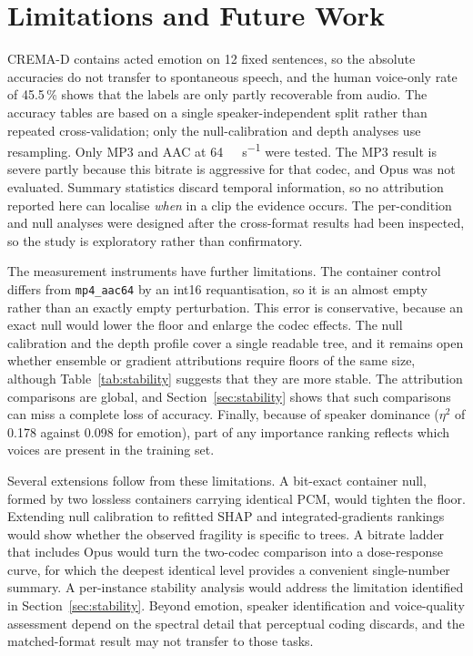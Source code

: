 \documentclass[lettersize,journal]{IEEEtran}
\newcommand{\ttf}[1]{\texttt{\footnotesize #1}}
\begin{document}
\section{Limitations and Future Work}
CREMA-D contains acted emotion on 12 fixed sentences, so the absolute
accuracies do not transfer to spontaneous speech, and the human voice-only rate
of 45.5\,\% shows that the labels are only partly recoverable from audio. The
accuracy tables are based on a single speaker-independent split rather than
repeated cross-validation; only the null-calibration and depth analyses use
resampling. Only MP3 and AAC at \SI{64}{\kilo\bit\per\second} were tested. The
MP3 result is severe partly because this bitrate is aggressive for that codec,
and Opus was not evaluated. Summary statistics discard temporal information, so
no attribution reported here can localise \emph{when} in a clip the evidence
occurs. The per-condition and null analyses were designed after the
cross-format results had been inspected, so the study is exploratory rather
than confirmatory.

The measurement instruments have further limitations. The container control
differs from \ttf{mp4\_aac64} by an int16 requantisation, so it is an almost
empty rather than an exactly empty perturbation. This error is conservative,
because an exact null would lower the floor and enlarge the codec effects. The
null calibration and the depth profile cover a single readable tree, and it
remains open whether ensemble or gradient attributions require floors of the
same size, although Table~\ref{tab:stability} suggests that they are more
stable. The attribution comparisons are global, and
Section~\ref{sec:stability} shows that such comparisons can miss a complete
loss of accuracy. Finally, because of speaker dominance ($\eta^2$ of 0.178
against 0.098 for emotion), part of any importance ranking reflects which
voices are present in the training set.

Several extensions follow from these limitations. A bit-exact container null,
formed by two lossless containers carrying identical PCM, would tighten the
floor. Extending null calibration to refitted SHAP and integrated-gradients
rankings would show whether the observed fragility is specific to trees. A
bitrate ladder that includes Opus would turn the two-codec comparison into a
dose-response curve, for which the deepest identical level provides a
convenient single-number summary. A per-instance stability analysis would
address the limitation identified in Section~\ref{sec:stability}. Beyond
emotion, speaker identification and voice-quality assessment depend on the
spectral detail that perceptual coding discards, and the matched-format result
may not transfer to those tasks.
\end{document}
